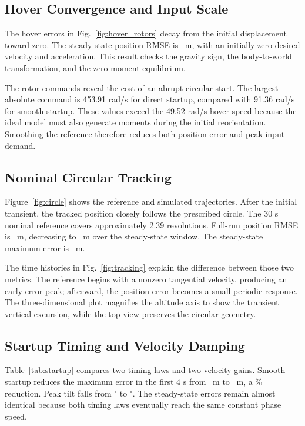 \documentclass[letterpaper,10pt,conference]{ieeeconf}
\begin{document}
\subsection{Hover Convergence and Input Scale}
The hover errors in Fig.~\ref{fig:hover_rotors} decay from the initial displacement toward zero. The steady-state position RMSE is \HoverRMSE\ m, with an initially zero desired velocity and acceleration. This result checks the gravity sign, the body-to-world transformation, and the zero-moment equilibrium.

The rotor commands reveal the cost of an abrupt circular start. The largest absolute command is 453.91 rad/s for direct startup, compared with 91.36 rad/s for smooth startup. These values exceed the 49.52 rad/s hover speed because the ideal model must also generate moments during the initial reorientation. Smoothing the reference therefore reduces both position error and peak input demand.

\subsection{Nominal Circular Tracking}
Figure~\ref{fig:circle} shows the reference and simulated trajectories. After the initial transient, the tracked position closely follows the prescribed circle. The 30 s nominal reference covers approximately 2.39 revolutions. Full-run position RMSE is \NomAll\ m, decreasing to \NomRMSE\ m over the steady-state window. The steady-state maximum error is \NomMax\ m.

The time histories in Fig.~\ref{fig:tracking} explain the difference between those two metrics. The reference begins with a nonzero tangential velocity, producing an early error peak; afterward, the position error becomes a small periodic response. The three-dimensional plot magnifies the altitude axis to show the transient vertical excursion, while the top view preserves the circular geometry.

\subsection{Startup Timing and Velocity Damping}
Table~\ref{tab:startup} compares two timing laws and two velocity gains. Smooth startup reduces the maximum error in the first 4 s from \NomStart\ m to \SmoothStart\ m, a \StartGain\% reduction. Peak tilt falls from \NomTilt$^\circ$ to \SmoothTilt$^\circ$. The steady-state errors remain almost identical because both timing laws eventually reach the same constant phase speed.
\end{document}
